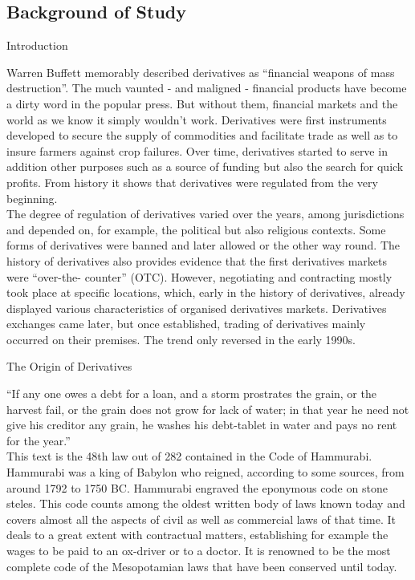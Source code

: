 \documentclass[unknownkeysallowed, compress]{beamer}
\theoremstyle{plain}
\begin{document}
\subsection{Background of Study}
\begin{frame}[allowframebreaks]{Introduction}
\noindent
\par Warren Buffett memorably described derivatives as ``financial weapons of mass
destruction''. The much vaunted - and maligned - financial products have become a dirty
word in the popular press. But without them, financial markets and the world as we
know it simply wouldn't work. Derivatives were first instruments developed to secure the
supply of commodities and facilitate trade as well as to insure farmers against crop
failures. Over time, derivatives started to serve in addition other purposes such as a
source of funding but also the search for quick profits. From history it shows that
derivatives were regulated from the very beginning.\\
The degree of regulation of derivatives varied over the years, among jurisdictions and
depended on, for example, the political but also religious contexts. Some forms of
derivatives were banned and later allowed or the other way round. The history of
derivatives also provides evidence that the first derivatives markets were ``over-the-
counter'' (OTC). However, negotiating and contracting mostly took place at specific
locations, which, early in the history of derivatives, already displayed various
characteristics of organised derivatives markets. Derivatives exchanges came later, but
once established, trading of derivatives mainly occurred on their premises. The trend
only reversed in the early 1990s.
\end{frame}

\begin{frame}{The Origin of Derivatives}

\noindent
\par ``If any one owes a debt for a loan, and a storm prostrates the grain, or the harvest
fail, or the grain does not grow for lack of water; in that year he need not give his creditor
any grain, he washes his debt-tablet in water and pays no rent for the year.''\\
This text is the 48th law out of 282 contained in the Code of Hammurabi. Hammurabi was
a king of Babylon who reigned, according to some sources, from around 1792 to 1750 BC.
Hammurabi engraved the eponymous code on stone steles. This code counts among the
oldest written body of laws known today and covers almost all the aspects of civil as well
as commercial laws of that time. It deals to a great extent with contractual matters,
establishing for example the wages to be paid to an ox-driver or to a doctor. It is
renowned to be the most complete code of the Mesopotamian laws that have been
conserved until today.
\end{frame}
\end{document}
